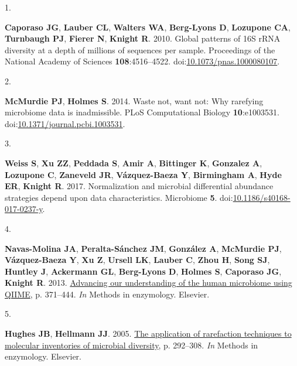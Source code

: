 \documentclass[
]{article}
\newlength{\cslhangindent}
\newlength{\csllabelwidth}
\newlength{\cslentryspacingunit} %
\newenvironment{CSLReferences}[2] %
 {%
  \setlength{\parindent}{0pt}
  \ifodd #1
  \let\oldpar\par
  \def\par{\hangindent=\cslhangindent\oldpar}
  \fi
  \setlength{\parskip}{#2\cslentryspacingunit}
 }%
 {}
\newcommand{\CSLLeftMargin}[1]{\parbox[t]{\csllabelwidth}{#1}}
\newcommand{\CSLRightInline}[1]{\parbox[t]{\linewidth - \csllabelwidth}{#1}\break}
\begin{document}
\hypertarget{refs}{}
\begin{CSLReferences}{0}{1}
\leavevmode{}%
\CSLLeftMargin{1. }%
\CSLRightInline{\textbf{Caporaso JG}, \textbf{Lauber CL},
\textbf{Walters WA}, \textbf{Berg-Lyons D}, \textbf{Lozupone CA},
\textbf{Turnbaugh PJ}, \textbf{Fierer N}, \textbf{Knight R}. 2010.
Global patterns of 16S {rRNA} diversity at a depth of millions of
sequences per sample. Proceedings of the National Academy of Sciences
\textbf{108}:4516--4522.
doi:\href{https://doi.org/10.1073/pnas.1000080107}{10.1073/pnas.1000080107}.}

\leavevmode{}%
\CSLLeftMargin{2. }%
\CSLRightInline{\textbf{McMurdie PJ}, \textbf{Holmes S}. 2014. Waste
not, want not: Why rarefying microbiome data is inadmissible. {PLoS}
Computational Biology \textbf{10}:e1003531.
doi:\href{https://doi.org/10.1371/journal.pcbi.1003531}{10.1371/journal.pcbi.1003531}.}

\leavevmode{}%
\CSLLeftMargin{3. }%
\CSLRightInline{\textbf{Weiss S}, \textbf{Xu ZZ}, \textbf{Peddada S},
\textbf{Amir A}, \textbf{Bittinger K}, \textbf{Gonzalez A},
\textbf{Lozupone C}, \textbf{Zaneveld JR}, \textbf{Vázquez-Baeza Y},
\textbf{Birmingham A}, \textbf{Hyde ER}, \textbf{Knight R}. 2017.
Normalization and microbial differential abundance strategies depend
upon data characteristics. Microbiome \textbf{5}.
doi:\href{https://doi.org/10.1186/s40168-017-0237-y}{10.1186/s40168-017-0237-y}.}

\leavevmode{}%
\CSLLeftMargin{4. }%
\CSLRightInline{\textbf{Navas-Molina JA}, \textbf{Peralta-Sánchez JM},
\textbf{González A}, \textbf{McMurdie PJ}, \textbf{Vázquez-Baeza Y},
\textbf{Xu Z}, \textbf{Ursell LK}, \textbf{Lauber C}, \textbf{Zhou H},
\textbf{Song SJ}, \textbf{Huntley J}, \textbf{Ackermann GL},
\textbf{Berg-Lyons D}, \textbf{Holmes S}, \textbf{Caporaso JG},
\textbf{Knight R}. 2013.
\href{https://doi.org/10.1016/b978-0-12-407863-5.00019-8}{Advancing our
understanding of the human microbiome using {QIIME}}, p. 371--444.
\emph{In} Methods in enzymology. Elsevier.}

\leavevmode{}%
\CSLLeftMargin{5. }%
\CSLRightInline{\textbf{Hughes JB}, \textbf{Hellmann JJ}. 2005.
\href{https://doi.org/10.1016/s0076-6879(05)97017-1}{The application of
rarefaction techniques to molecular inventories of microbial diversity},
p. 292--308. \emph{In} Methods in enzymology. Elsevier.}


\end{CSLReferences}
\end{document}
